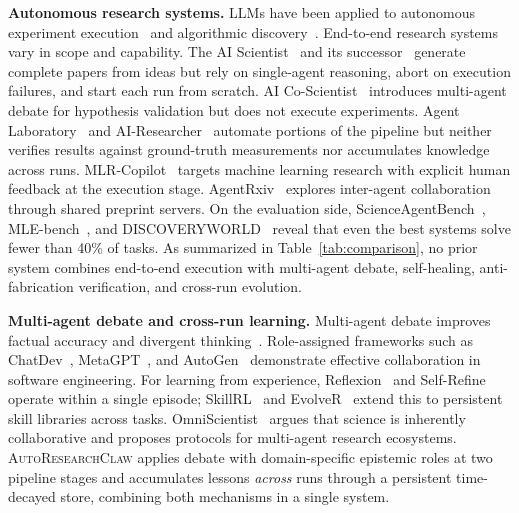 \documentclass{llmxive}
\providecommand{\system}{\textsc{AutoResearchClaw}}
\begin{document}
\noindent \textbf{Autonomous research systems.}
LLMs have been applied to autonomous experiment execution~\citep{boiko2023emergent} and algorithmic discovery~\citep{romera2024mathematical, novikov2025alphaevolve}. End-to-end research systems vary in scope and capability. The AI Scientist~\citep{lu2024aiscientist} and its successor~\citep{yamada2025aiscientistv2} generate complete papers from ideas but rely on single-agent reasoning, abort on execution failures, and start each run from scratch. AI Co-Scientist~\citep{gottweis2025aicoscientist, gottweis2025towards} introduces multi-agent debate for hypothesis validation but does not execute experiments. Agent Laboratory~\citep{schmidgall2025agentlab} and AI-Researcher~\citep{tang2025airesearcher} automate portions of the pipeline but neither verifies results against ground-truth measurements nor accumulates knowledge across runs. MLR-Copilot~\citep{li2024mlrcopilot} targets machine learning research with explicit human feedback at the execution stage. AgentRxiv~\citep{schmidgall2025agentrxiv} explores inter-agent collaboration through shared preprint servers. On the evaluation side, ScienceAgentBench~\citep{tian2024scienceagentbench}, MLE-bench~\citep{chan2024mlebench}, and DISCOVERYWORLD~\citep{jansen2024discoveryworld} reveal that even the best systems solve fewer than 40\% of tasks. As summarized in Table~\ref{tab:comparison}, no prior system combines end-to-end execution with multi-agent debate, self-healing, anti-fabrication verification, and cross-run evolution.

\noindent \textbf{Multi-agent debate and cross-run learning.}
Multi-agent debate improves factual accuracy and divergent thinking~\citep{du2023improving, liang2023encouraging, tran2025multiagent}. Role-assigned frameworks such as ChatDev~\citep{qian2024chatdev}, MetaGPT~\citep{hong2024metagpt}, and AutoGen~\citep{wu2024autogen} demonstrate effective collaboration in software engineering. For learning from experience, Reflexion~\citep{shinn2023reflexion} and Self-Refine~\citep{madaan2023selfrefine} operate within a single episode; SkillRL~\citep{xia2026skillrl} and EvolveR~\citep{wang2025evolver} extend this to persistent skill libraries across tasks. OmniScientist~\citep{shao2025omniscientist} argues that science is inherently collaborative and proposes protocols for multi-agent research ecosystems. \system{} applies debate with domain-specific epistemic roles at two pipeline stages and accumulates lessons \emph{across} runs through a persistent time-decayed store, combining both mechanisms in a single system.
\end{document}

